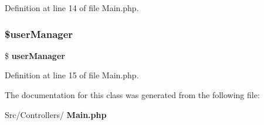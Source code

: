 Definition at line 14 of file Main.\+php.

\mbox{\label{class_src_1_1_controllers_1_1_main_afd45ca85c50f41c20a03f0a8d0f4db23}} 
\subsubsection{\$user\+Manager}
{\footnotesize\ttfamily \$\textbf{ user\+Manager}\hspace{0.3cm}{\ttfamily [protected]}}



Definition at line 15 of file Main.\+php.



The documentation for this class was generated from the following file\+:\begin{DoxyCompactItemize}
\item 
Src/\+Controllers/\textbf{ Main.\+php}\end{DoxyCompactItemize}
